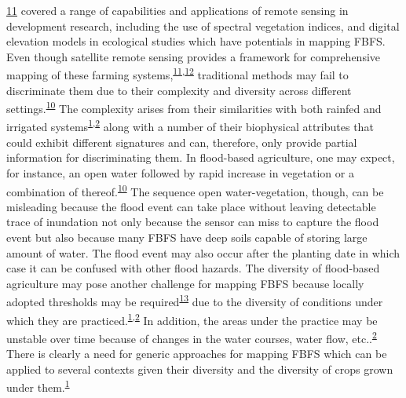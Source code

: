 \documentclass[12pt,oneside]{article}
\begin{document}
\protect\hyperlink{ref-Wegmann_et_al_2016}{11} covered a range of capabilities and applications of remote sensing in development research, including the use of spectral vegetation indices, and digital elevation models in ecological studies which have potentials in mapping FBFS. Even though satellite remote sensing provides a framework for comprehensive mapping of these farming systems,\textsuperscript{\protect\hyperlink{ref-Wegmann_et_al_2016}{11},\protect\hyperlink{ref-Konecny_2014}{12}} traditional methods may fail to discriminate them due to their complexity and diversity across different settings.\textsuperscript{\protect\hyperlink{ref-Boschetti_et_al_2014}{10}} The complexity arises from their similarities with both rainfed and irrigated systems\textsuperscript{\protect\hyperlink{ref-Puertas_et_al_2011}{1},\protect\hyperlink{ref-VanSteenbergen_et_al_2010}{2}} along with a number of their biophysical attributes that could exhibit different signatures and can, therefore, only provide partial information for discriminating them. In flood-based agriculture, one may expect, for instance, an open water followed by rapid increase in vegetation or a combination of thereof.\textsuperscript{\protect\hyperlink{ref-Boschetti_et_al_2014}{10}} The sequence open water-vegetation, though, can be misleading because the flood event can take place without leaving detectable trace of inundation not only because the sensor can miss to capture the flood event but also because many FBFS have deep soils capable of storing large amount of water. The flood event may also occur after the planting date in which case it can be confused with other flood hazards. The diversity of flood-based agriculture may pose another challenge for mapping FBFS because locally adopted thresholds may be required\textsuperscript{\protect\hyperlink{ref-Bashari_et_al_2008}{13}} due to the diversity of conditions under which they are practiced.\textsuperscript{\protect\hyperlink{ref-Puertas_et_al_2011}{1},\protect\hyperlink{ref-VanSteenbergen_et_al_2010}{2}} In addition, the areas under the practice may be unstable over time because of changes in the water courses, water flow, etc..\textsuperscript{\protect\hyperlink{ref-VanSteenbergen_et_al_2010}{2}} There is clearly a need for generic approaches for mapping FBFS which can be applied to several contexts given their diversity and the diversity of crops grown under them.\textsuperscript{\protect\hyperlink{ref-Puertas_et_al_2011}{1}}
\end{document}
